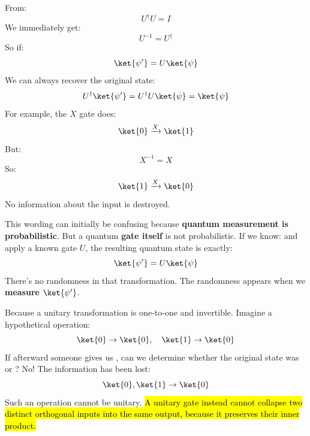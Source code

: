 \begin{remarkbox}
     From:
    \begin{equation*}
        U^\dagger U=I
    \end{equation*}
    We immediately get:
    \begin{equation*}
        U^{-1}=U^\dagger
    \end{equation*}
    So if:
    \begin{equation*}
        \ket{\psi'} = U \ket{\psi}
    \end{equation*}
    We can always recover the original state:
    \begin{equation*}
        U^\dagger\ket{\psi'}
        =
        U^\dagger U\ket{\psi}
        =
        \ket{\psi}
    \end{equation*}
    For example, the $X$ gate does:
    \begin{equation*}
        \ket{0}\xrightarrow{X}\ket{1}
    \end{equation*}
    But:
    \begin{equation*}
        X^{-1}=X
    \end{equation*}
    So:
    \begin{equation*}
        \ket{1}\xrightarrow{X}\ket{0}
    \end{equation*}
    No information about the input is destroyed.

    \highspace
     This wording can initially be confusing because \textbf{quantum measurement is probabilistic}. But a quantum \textbf{gate itself} is not probabilistic. If we know: \ket{\psi} and apply a known gate $U$, the resulting quantum state is exactly:
    \begin{equation*}
        \ket{\psi'} = U \ket{\psi}
    \end{equation*}
    There's no randomness in that transformation. The randomness appears when we \textbf{measure} $\ket{\psi'}$.

    \highspace
     Because a unitary transformation is one-to-one and invertible. Imagine a hypothetical operation:
    \begin{equation*}
        \ket{0} \to \ket{0}, \quad \ket{1} \to \ket{0}
    \end{equation*}
    If afterward someone gives us , can we determine whether the original state was  or ? No! The information has been lost:
    \begin{equation*}
        \ket{0}, \ket{1} \to \ket{0}
    \end{equation*}
    Such an operation cannot be unitary. \hl{A unitary gate instead cannot collapse two distinct orthogonal inputs into the same output, because it preserves their inner product.}
\end{remarkbox}

